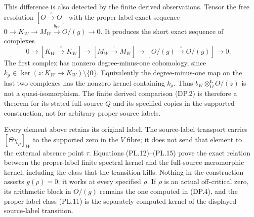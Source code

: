 This difference is also detected by the finite derived observations.
Tensor the free resolution $[O\xrightarrow{z}O]$ with the proper-label
exact sequence $0\to K_W\to M_W\xrightarrow{b_W}O/(g)\to0$.
It produces the short exact sequence of complexes
\[
 0\to[K_W\xrightarrow{z}K_W]\to[M_W\xrightarrow{z}M_W]
       \to[O/(g)\xrightarrow{z}O/(g)]\to0.
 \tag{PL.15}
\]
The first complex has nonzero degree-minus-one cohomology, since
$k_\rho\in\ker(z:K_W\to K_W)\setminus\{0\}$. Equivalently the
degree-minus-one map on the last two complexes has the nonzero
kernel containing $k_\rho$. Thus $b_W\otimes_O^{\mathbf L}O/(z)$
is not a quasi-isomorphism. The finite derived comparison (DP.2)
is therefore a theorem for its stated full-source $Q$ and its
specified copies in the supported construction, not for arbitrary
proper source labels.

Every element above retains its original label. The source-label
transport carries $[\Theta\chi_\rho]_W$ to the supported zero in
the $V$ fibre; it does not send that element to the external absence
point $\tau$. Equations (PL.12)--(PL.15) prove the exact relation
between the proper-label finite spectral kernel and the full-source
meromorphic kernel, including the class that the transition kills.
Nothing in the construction asserts $g(\rho)=0$; it works at every
specified $\rho$. If $\rho$ is an actual off-critical zero, its
arithmetic block in $O/(g)$ remains the one computed in (DP.4),
and the proper-label class (PL.11) is the separately computed
kernel of the displayed source-label transition.
